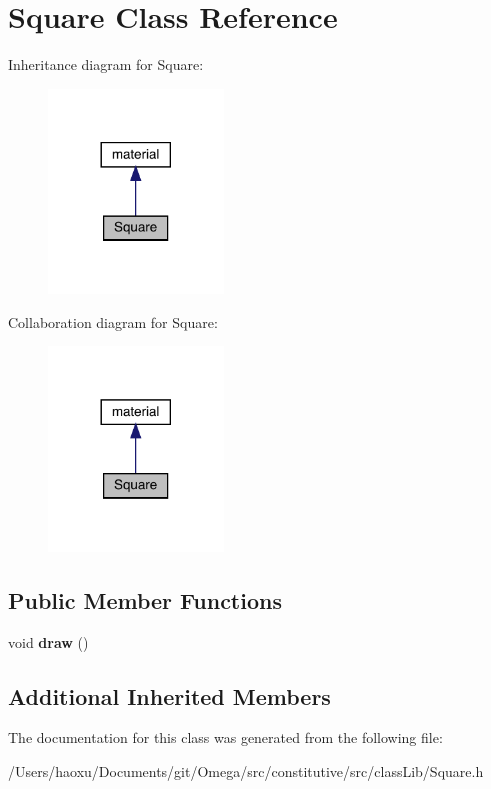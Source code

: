 \hypertarget{class_square}{}\section{Square Class Reference}
\label{class_square}


Inheritance diagram for Square\+:
\nopagebreak
\begin{figure}[H]
\begin{center}
\leavevmode
\includegraphics[width=132pt]{class_square__inherit__graph}
\end{center}
\end{figure}


Collaboration diagram for Square\+:
\nopagebreak
\begin{figure}[H]
\begin{center}
\leavevmode
\includegraphics[width=132pt]{class_square__coll__graph}
\end{center}
\end{figure}
\subsection*{Public Member Functions}
\begin{DoxyCompactItemize}
\item 
\mbox{\label{class_square_a2a8be87e5cb58dd25a8af0f6166536b9}} 
void {\bfseries draw} ()
\end{DoxyCompactItemize}
\subsection*{Additional Inherited Members}


The documentation for this class was generated from the following file\+:\begin{DoxyCompactItemize}
\item 
/\+Users/haoxu/\+Documents/git/\+Omega/src/constitutive/src/class\+Lib/Square.\+h\end{DoxyCompactItemize}
